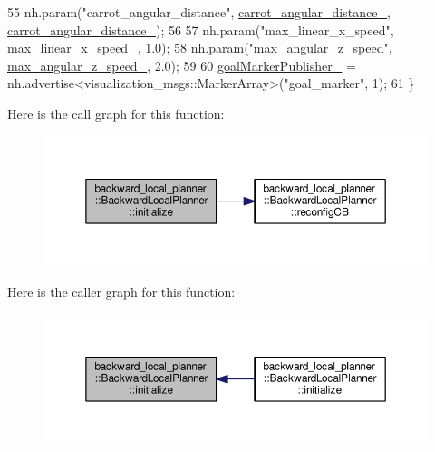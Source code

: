 \begin{DoxyCode}
55     nh.param(\textcolor{stringliteral}{"carrot\_angular\_distance"}, \hyperlink{classbackward__local__planner_1_1BackwardLocalPlanner_adcfcc43316a79db09f6c09b8e2a482b6}{carrot\_angular\_distance\_}, 
      \hyperlink{classbackward__local__planner_1_1BackwardLocalPlanner_adcfcc43316a79db09f6c09b8e2a482b6}{carrot\_angular\_distance\_});
56     
57     nh.param(\textcolor{stringliteral}{"max\_linear\_x\_speed"}, \hyperlink{classbackward__local__planner_1_1BackwardLocalPlanner_a649fccd71e53ae248ee2f51506e381d2}{max\_linear\_x\_speed\_}, 1.0);
58     nh.param(\textcolor{stringliteral}{"max\_angular\_z\_speed"}, \hyperlink{classbackward__local__planner_1_1BackwardLocalPlanner_a737a0163525aae9afb44bd17f9e013ad}{max\_angular\_z\_speed\_}, 2.0);
59     
60     \hyperlink{classbackward__local__planner_1_1BackwardLocalPlanner_aec215b9441f9ac359ea6a531339ac4f8}{goalMarkerPublisher\_} = nh.advertise<visualization\_msgs::MarkerArray>(\textcolor{stringliteral}{"goal\_marker"},
       1); 
61 \}
\end{DoxyCode}


Here is the call graph for this function\+:
\nopagebreak
\begin{figure}[H]
\begin{center}
\leavevmode
\includegraphics[width=350pt]{classbackward__local__planner_1_1BackwardLocalPlanner_a49b011a3be1e39c1741c98d5dc377f55_cgraph}
\end{center}
\end{figure}




Here is the caller graph for this function\+:
\nopagebreak
\begin{figure}[H]
\begin{center}
\leavevmode
\includegraphics[width=350pt]{classbackward__local__planner_1_1BackwardLocalPlanner_a49b011a3be1e39c1741c98d5dc377f55_icgraph}
\end{center}
\end{figure}



